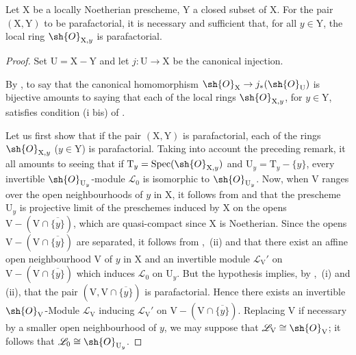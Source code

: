 \begin{proposition}[21.13.10]
\label{IV.21.13.10}
Let $\mathrm{X}$ be a locally Noetherian prescheme, $\mathrm{Y}$ a closed subset of $\mathrm{X}$.
For the pair $(\mathrm{X},\mathrm{Y})$ to be parafactorial, it is necessary and sufficient that, for all $y\in\mathrm{Y}$, the local ring $\sh{O}_{\mathrm{X},y}$ is parafactorial.
\end{proposition}

\begin{proof}
Set $\mathrm{U}=\mathrm{X}-\mathrm{Y}$ and let $j:\mathrm{U}\to\mathrm{X}$ be the canonical injection.

By , to say that the canonical homomorphism $\sh{O}_{\mathrm{X}}\to j_*(\sh{O}_{\mathrm{U}})$ is bijective amounts to saying that each of the local rings $\sh{O}_{\mathrm{X},y}$, for $y\in\mathrm{Y}$, satisfies condition (i bis) of .

Let us first show that if the pair $(\mathrm{X},\mathrm{Y})$ is parafactorial, each of the rings $\sh{O}_{\mathrm{X},y}$ ($y\in\mathrm{Y}$) is parafactorial.
Taking into account the preceding remark, it all amounts to seeing that if $\mathrm{T}_y=\operatorname{Spec}(\sh{O}_{\mathrm{X},y})$ and $\mathrm{U}_y=\mathrm{T}_y-\{y\}$, every invertible $\sh{O}_{\mathrm{U}_y}$-module $\mathscr{L}_0$ is isomorphic to $\sh{O}_{\mathrm{U}_y}$.
Now, when $\mathrm{V}$ ranges over the open neighbourhoods of $y$ in $\mathrm{X}$, it follows from  and  that the prescheme $\mathrm{U}_y$ is projective limit of the preschemes induced by $\mathrm{X}$ on the opens $\mathrm{V}-(\mathrm{V}\cap\overline{\{y\}})$, which are quasi-compact since $\mathrm{X}$ is Noetherian.
Since the opens $\mathrm{V}-(\mathrm{V}\cap\overline{\{y\}})$ are separated, it follows from ,~(ii) and  that there exist an affine open neighbourhood $\mathrm{V}$ of $y$ in $\mathrm{X}$ and an invertible module $\mathscr{L}_{\mathrm{V}}'$ on $\mathrm{V}-(\mathrm{V}\cap\overline{\{y\}})$ which induces $\mathscr{L}_0$ on $\mathrm{U}_y$.
But the hypothesis implies, by ,~(i) and (ii), that the pair $(\mathrm{V},\mathrm{V}\cap\overline{\{y\}})$ is parafactorial. Hence there exists an invertible $\sh{O}_{\mathrm{V}}$-Module $\mathscr{L}_{\mathrm{V}}$ inducing $\mathscr{L}_{\mathrm{V}}'$ on $\mathrm{V}-(\mathrm{V}\cap\overline{\{y\}})$. Replacing $\mathrm{V}$ if necessary by a smaller open neighbourhood of $y$, we may suppose that $\mathscr{L}_{\mathrm{V}}\cong\sh{O}_{\mathrm{V}}$; it follows that $\mathscr{L}_0\cong\sh{O}_{\mathrm{U}_y}$.


\end{proof}
